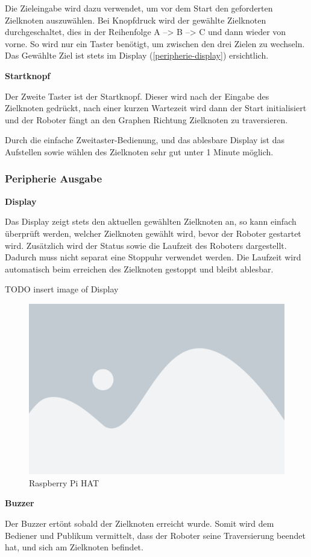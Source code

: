 Die Zieleingabe wird dazu verwendet, um vor dem Start den geforderten Zielknoten auszuwählen. Bei Knopfdruck wird der gewählte Zielknoten durchgeschaltet, dies in der Reihenfolge A --> B --> C und dann wieder von vorne. So wird nur ein Taster benötigt, um zwischen den drei Zielen zu wechseln. Das Gewählte Ziel ist stets im Display (\ref{peripherie-display}) ersichtlich.

\textbf{Startknopf}

Der Zweite Taster ist der Startknopf. Dieser wird nach der Eingabe des Zielknoten gedrückt, nach einer kurzen Wartezeit wird dann der Start initialisiert und der Roboter fängt an den Graphen Richtung Zielknoten zu traversieren.

Durch die einfache Zweitaster-Bedienung, und das ablesbare Display ist das Aufstellen sowie wählen des Zielknoten sehr gut unter 1 Minute möglich. 

\subsubsection{Peripherie Ausgabe}

\textbf{Display}\label{peripherie-display}

Das Display zeigt stets den aktuellen gewählten Zielknoten an, so kann einfach überprüft werden, welcher Zielknoten gewählt wird, bevor der Roboter gestartet wird. 
Zusätzlich wird der Status sowie die Laufzeit des Roboters dargestellt. Dadurch muss nicht separat eine Stoppuhr verwendet werden. Die Laufzeit wird automatisch beim erreichen des Zielknoten gestoppt und bleibt ablesbar.

TODO insert image of Display
\begin{figure}[H]
    \centering
    \includegraphics[width=0.5\linewidth]{assets/placeholder.png}
    \caption{Raspberry Pi HAT}
    \label{fig:raspiheader-assembly}
\end{figure}


\textbf{Buzzer}\label{peripherie-buzzer}

Der Buzzer ertönt sobald der Zielknoten erreicht wurde. Somit wird dem Bediener und Publikum vermittelt, dass der Roboter seine Traversierung beendet hat, und sich am Zielknoten befindet.
